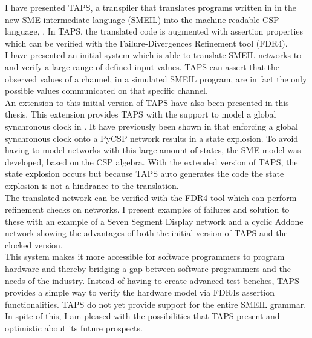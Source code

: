 I have presented TAPS, a transpiler that translates programs written in in the
new SME intermediate language (SMEIL) into the machine-readable CSP language,
\cspm{}. In TAPS, the translated \cspm{} code is augmented with assertion
properties which can be verified with the Failure-Divergences Refinement tool
(FDR4).\\
I have presented an initial system which is able to translate SMEIL networks to
\cspm{} and verify a large range of defined input values. TAPS can assert that
the observed values of a channel, in a simulated SMEIL program, are in fact the
only possible values communicated on that specific channel. \\

An extension to this initial version of TAPS have also been presented in this
thesis. This extension provides TAPS with the support to model a global
synchronous clock in \cspm{}. It have previously been shown in \cite{Skaarup14}
that enforcing a global synchronous clock onto a PyCSP network results in a
state explosion. To avoid having to model networks with this large amount of
states, the SME model was developed, based on the CSP algebra. With the
extended version of TAPS, the state explosion occurs but because TAPS auto
generates the \cspm{} code the state explosion is not a hindrance to the
translation.\\

The translated \cspm{} network can be verified with the FDR4 tool which can
perform refinement checks on \cspm{} networks. I present examples of failures
and solution to these with an example of a Seven Segment Display network and a
cyclic Addone network showing the advantages of both the initial version of TAPS and the clocked version.\\

This system makes it more accessible for software programmers to program
hardware and thereby bridging a gap between software programmers and the needs
of the industry.
Instead of having to create advanced test-benches, TAPS provides a simple
way to verify the hardware model via FDR4s assertion functionalities.
TAPS do not yet provide support for the entire SMEIL grammar. In spite of this,
I am pleased with the possibilities that TAPS present and optimistic about its future prospects.



